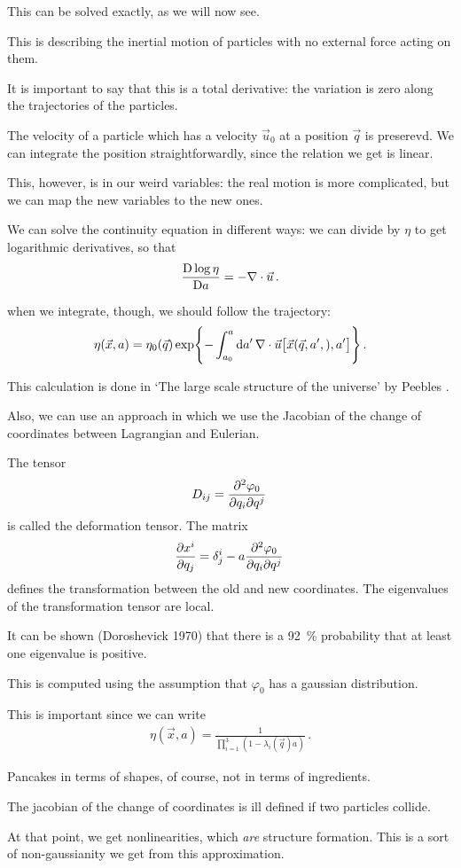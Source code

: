 \documentclass[main.tex]{subfiles}
\begin{document}
This can be solved exactly, as we will now see.

This is describing the inertial motion of particles with no external force acting on them. 

It is important to say that this is a total derivative: the variation is zero along the trajectories of the particles.

The velocity of a particle which has a velocity \(\vec{u}_{0}\) at a position \(\vec{q}\) is preserevd. We can integrate the position straightforwardly, since the relation we get is linear.

This, however, is in our weird variables: the real motion is more complicated, but we can map the new variables to the new ones.

We can solve the continuity equation in different ways: we can divide by \(\eta \) to get logarithmic derivatives, so that 
%
\begin{align}
\frac{\mathrm{D} \log \eta }{\mathrm{D} a} =  -\nabla \cdot \vec{u}
\,.
\end{align}

when we integrate, though, we should follow the trajectory: 
%
\begin{align}
\eta (\vec{x}, a) = \eta_0 (\vec{q}) \exp{ - \int_{a_0 }^{a} \dd{a'} \nabla \cdot \vec{u} \qty[\vec{x}(\vec{q}, a',), a']}
\,.
\end{align}

This calculation is done in `The large scale structure of the universe' by Peebles \cite[]{peeblesLargescaleStructureUniverse1980}.

Also, we can use an approach in which we use the Jacobian of the change of coordinates between Lagrangian and Eulerian.

The tensor 
%
\begin{align}
D_{ij} = \pdv[2]{\varphi_0}{q_{i}}{q^{j}}
\,
\end{align}
%
is called the deformation tensor.
The matrix 
%
\begin{align}
\pdv{x^{i}}{q_{j}} = \delta^{i}_{j} - a \pdv[2]{\varphi_0}{q_{i}}{q^{j}}
\,
\end{align}
%
defines the transformation between the old and new coordinates.
The eigenvalues of the transformation tensor are local. 

It can be shown (Doroshevick 1970) that there is a \SI{92}{\percent} probability that at least one eigenvalue is positive.

This is computed using the assumption that \(\varphi_0 \) has a gaussian distribution.

This is important since we can write 
%
\begin{align}
\eta (\vec{x}, a) = \frac{1}{\prod_{i=1}^{3} (1 - \lambda_{i}(\vec{q}) a)}
\,.
\end{align}

Pancakes in terms of shapes, of course, not in terms of ingredients.

The jacobian of the change of coordinates is ill defined if two particles collide. 

At that point, we get nonlinearities, which \emph{are} structure formation.
This is a sort of non-gaussianity we get from this approximation.
\end{document}
